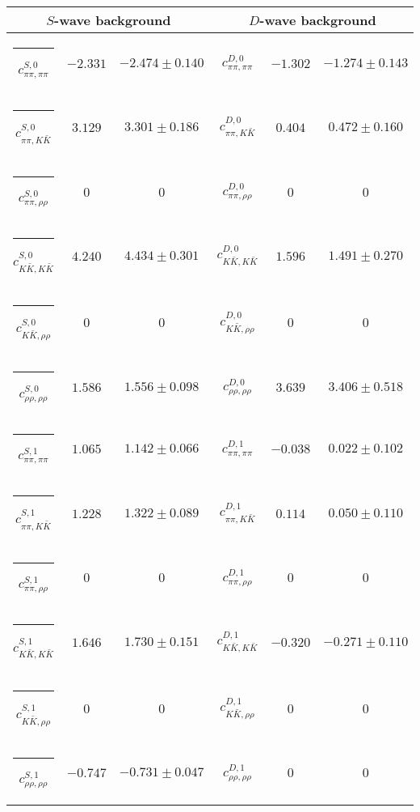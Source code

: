 \begin{table}[h]
\begin{ruledtabular}
\begin{tabular}{c c c c c c c c c}
\end{tabular}
\vspace{2em}
\begin{tabular}{c c c c c c}
\multicolumn{3}{c}{$S$-wave background}  & \multicolumn{3}{c}{$D$-wave background} \\ \hline
\rule[-0.2cm]{-0.1cm}{.55cm} $c^{S,0}_{\pi\pi,\pi\pi}$ &$-2.331$ & $-2.474 \pm 0.140$ & $c^{D,0}_{\pi\pi,\pi\pi}$ &$-1.302$ & $-1.274 \pm 0.143$ \\
\rule[-0.2cm]{-0.1cm}{.55cm} $c^{S,0}_{\pi\pi,K\bar K}$ &$3.129$ & $3.301 \pm 0.186$ & $c^{D,0}_{\pi\pi,K\bar K}$ &$0.404$ & $0.472 \pm 0.160$ \\
\rule[-0.2cm]{-0.1cm}{.55cm} $c^{S,0}_{\pi\pi,\rho\rho}$ &$0$ & $0$ & $c^{D,0}_{\pi\pi,\rho\rho}$ &$0$ & $0$ \\
\rule[-0.2cm]{-0.1cm}{.55cm} $c^{S,0}_{K\bar K,K\bar K}$ &$4.240$ & $4.434 \pm 0.301$ & $c^{D,0}_{K\bar K,K\bar K}$ &$1.596$ & $1.491 \pm 0.270$ \\
\rule[-0.2cm]{-0.1cm}{.55cm} $c^{S,0}_{K\bar K,\rho\rho}$ &$0$ & $0$ & $c^{D,0}_{K\bar K,\rho\rho}$ &$0$ & $0$ \\
\rule[-0.2cm]{-0.1cm}{.55cm} $c^{S,0}_{\rho\rho,\rho\rho}$ &$1.586$ & $1.556 \pm 0.098$ & $c^{D,0}_{\rho\rho,\rho\rho}$ &$3.639$ & $3.406 \pm 0.518$ \\
\rule[-0.2cm]{-0.1cm}{.55cm} $c^{S,1}_{\pi\pi,\pi\pi}$ &$1.065$ & $1.142 \pm 0.066$ & $c^{D,1}_{\pi\pi,\pi\pi}$ &$-0.038$ & $0.022 \pm 0.102$ \\
\rule[-0.2cm]{-0.1cm}{.55cm} $c^{S,1}_{\pi\pi,K\bar K}$ &$1.228$ & $1.322 \pm 0.089$ & $c^{D,1}_{\pi\pi,K\bar K}$ &$0.114$ & $0.050 \pm 0.110$ \\
\rule[-0.2cm]{-0.1cm}{.55cm} $c^{S,1}_{\pi\pi,\rho\rho}$ &$0$ & $0$ & $c^{D,1}_{\pi\pi,\rho\rho}$ &$0$ & $0$ \\
\rule[-0.2cm]{-0.1cm}{.55cm} $c^{S,1}_{K\bar K,K\bar K}$ &$1.646$ & $1.730 \pm 0.151$ & $c^{D,1}_{K\bar K,K\bar K}$ &$-0.320$ & $-0.271 \pm 0.110$ \\
\rule[-0.2cm]{-0.1cm}{.55cm} $c^{S,1}_{K\bar K,\rho\rho}$ &$0$ & $0$ & $c^{D,1}_{K\bar K,\rho\rho}$ &$0$ & $0$ \\
\rule[-0.2cm]{-0.1cm}{.55cm} $c^{S,1}_{\rho\rho,\rho\rho}$ &$-0.747$ & $-0.731 \pm 0.047$ & $c^{D,1}_{\rho\rho,\rho\rho}$ &$0$ & $0$ \\
\end{tabular}
\end{ruledtabular}
\end{table}
